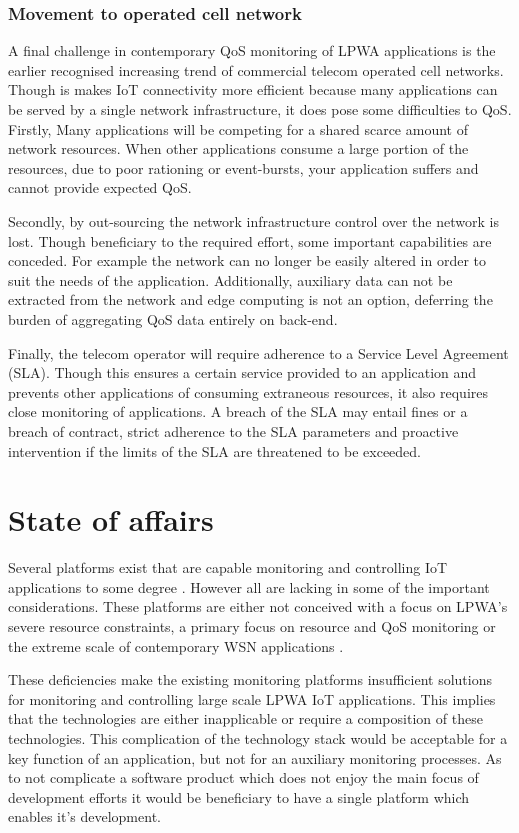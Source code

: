 \subsubsection{Movement to operated cell network}
A final challenge in contemporary QoS monitoring of LPWA applications is the earlier recognised increasing trend of commercial telecom operated cell networks. Though is makes IoT connectivity more efficient because many applications can be served by a single network infrastructure, it does pose some difficulties to QoS. Firstly, Many applications will be competing for a shared scarce amount of network resources. When other applications consume a large portion of the resources, due to poor rationing or event-bursts, your application suffers and cannot provide expected QoS.

Secondly, by out-sourcing the network infrastructure control over the network is lost. Though beneficiary to the required effort, some important capabilities are conceded. For example the network can no longer be easily altered in order to suit the needs of the application. Additionally, auxiliary data can not be extracted from the network and edge computing is not an option, deferring the burden of aggregating QoS data entirely on back-end.

Finally, the telecom operator will require adherence to a Service Level Agreement (SLA). Though this ensures a certain service provided to an application and prevents other applications of consuming extraneous resources, it also requires close monitoring of applications. A breach of the SLA may entail fines or a breach of contract, strict adherence to the SLA parameters and proactive intervention if the limits of the SLA are threatened to be exceeded. \cite{zoek refs in rtopics}

\section{State of affairs}
Several platforms exist that are capable monitoring and controlling IoT applications to some degree \cite{refs_to_platoforms}. However all are lacking in some of the important considerations. These platforms are either not conceived with a focus on LPWA's severe resource constraints, a primary focus on resource and QoS monitoring or the extreme scale of contemporary WSN applications \cite{platform surveys}.

These deficiencies make the existing monitoring platforms insufficient solutions for monitoring and controlling large scale LPWA IoT applications. This implies that the technologies are either inapplicable or require a composition of these technologies. This complication of the technology stack would be acceptable for a key function of an application, but not for an auxiliary monitoring processes. As to not complicate a software product which does not enjoy the main focus of development efforts it would be beneficiary to have a single platform which enables it's development.


